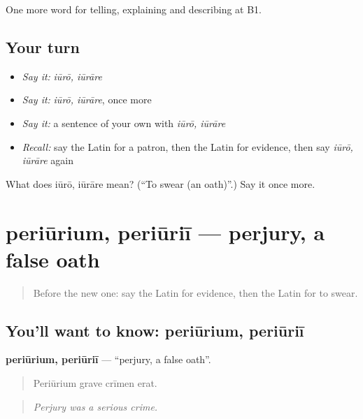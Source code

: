 \begin{grammarlens}[title={What you've built}]
One more word for telling, explaining and describing at B1.
\end{grammarlens}

\subsection*{Your turn}
\begin{itemize}
\raggedright
  \item \emph{Say it:} \emph{iūrō, iūrāre}
  \item \emph{Say it:} \emph{iūrō, iūrāre}, once more
  \item \emph{Say it:} a sentence of your own with \emph{iūrō, iūrāre}
  \item \emph{Recall:} say the Latin for a patron, then the Latin for evidence, then say \emph{iūrō, iūrāre} again
\end{itemize}

\begin{tcolorbox}[breakable,colback=teal!4,colframe=teal!35!black,title={Before you move on}]
What does iūrō, iūrāre mean? (\textquotedblleft{}To swear (an oath)\textquotedblright{}.) Say it once more.
\end{tcolorbox}
\section[periūrium, periūriī]{periūrium, periūriī — perjury, a false oath}

\label{lesson:LA-C310-periurium}



\begin{quote}
Before the new one: say the Latin for evidence, then the Latin for to swear.
\end{quote}

\subsection*{You'll want to know: periūrium, periūriī}
\textbf{periūrium, periūriī} — \textquotedblleft{}perjury, a false oath\textquotedblright{}.

\begin{quote}
Periūrium grave crīmen erat.
\end{quote}

\begin{quote}
\emph{Perjury was a serious crime.}
\end{quote}

